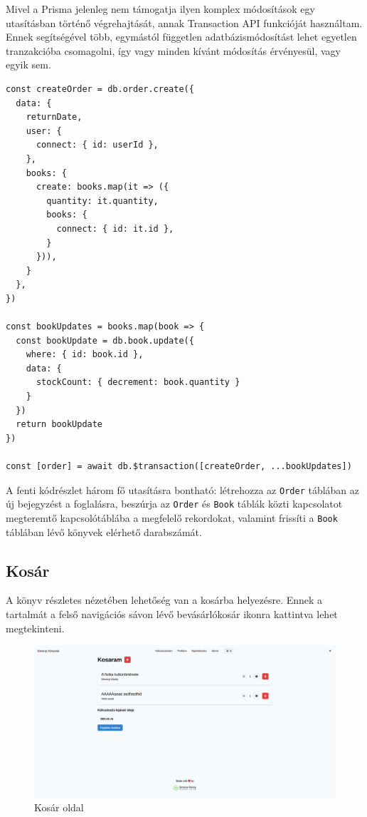 Mivel a Prisma jelenleg nem támogatja ilyen komplex módosítások egy utasításban történő végrehajtását, annak Transaction API
funkcióját használtam. Ennek segítségével több, egymástól független adatbázismódosítást lehet egyetlen tranzakcióba csomagolni,
így vagy minden kívánt módosítás érvényesül, vagy egyik sem.

\begin{lstlisting}[caption=Transaction API használata kölcsönzés létrehozásakor]
const createOrder = db.order.create({
  data: {
    returnDate,
    user: {
      connect: { id: userId },
    },
    books: {
      create: books.map(it => ({
        quantity: it.quantity,
        books: {
          connect: { id: it.id },
        }
      })),
    }
  },
})

const bookUpdates = books.map(book => {
  const bookUpdate = db.book.update({
    where: { id: book.id },
    data: {
      stockCount: { decrement: book.quantity }
    }
  })
  return bookUpdate
})

const [order] = await db.$transaction([createOrder, ...bookUpdates])
\end{lstlisting}

A fenti kódrészlet három fő utasításra bontható: létrehozza az \lstinline|Order| táblában az új bejegyzést a foglalásra,
beszúrja az \lstinline|Order| és \lstinline|Book| táblák közti kapcsolatot megteremtő kapcsolótáblába a megfelelő rekordokat,
valamint frissíti a \lstinline|Book| táblában lévő könyvek elérhető darabszámát.

\subsection{Kosár}

A könyv részletes nézetében lehetőség van a kosárba helyezésre. Ennek a tartalmát a felső navigációs sávon lévő bevásárlókosár
ikonra kattintva lehet megtekinteni.

\begin{figure}[!ht]
  \centering
  \includegraphics[width=150mm, keepaspectratio]{figures/cart.png}
  \caption{Kosár oldal}
  \label{fig:CartPage}
\end{figure}

